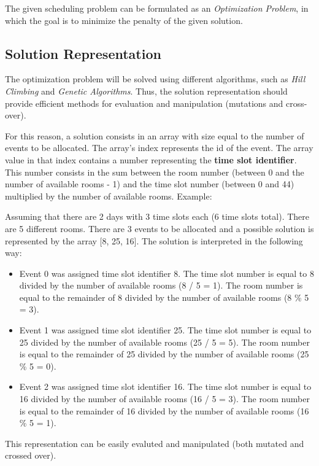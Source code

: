 \documentclass[conference]{IEEEtran}
\begin{document}
The given scheduling problem can be formulated as an \textit{Optimization Problem}, in which the goal is to minimize the penalty of the given solution.

\subsection{Solution Representation}

The optimization problem will be solved using different algorithms, such as \textit{Hill Climbing} and \textit{Genetic Algorithms}. Thus, the solution representation should provide efficient methods for evaluation and manipulation (mutations and cross-over).

For this reason, a solution consists in an array with size equal to the number of events to be allocated. The array's index represents the id of the event. The array value in that index contains a number representing the \textbf{time slot identifier}. This number consists in the sum between the room number (between 0 and the number of available rooms - 1) and the time slot number (between 0 and 44) multiplied by the number of available rooms. Example:

Assuming that there are 2 days with 3 time slots each (6 time slots total). There are 5 different rooms. There are 3 events to be allocated and a possible solution is represented by the array [8, 25, 16]. The solution is interpreted in the following way:

\begin{itemize}
    \item Event 0 was assigned time slot identifier 8. The time slot number is equal to 8 divided by the number of available rooms (8 / 5 = 1). The room number is equal to the remainder of 8 divided by the number of available rooms (8 \% 5 = 3).
    \item Event 1 was assigned time slot identifier 25. The time slot number is equal to 25 divided by the number of available rooms (25 / 5 = 5). The room number is equal to the remainder of 25 divided by the number of available rooms (25 \% 5 = 0).
    \item Event 2 was assigned time slot identifier 16. The time slot number is equal to 16 divided by the number of available rooms (16 / 5 = 3). The room number is equal to the remainder of 16 divided by the number of available rooms (16 \% 5 = 1).
\end{itemize}

This representation can be easily evaluted and manipulated (both mutated and crossed over).
\end{document}
